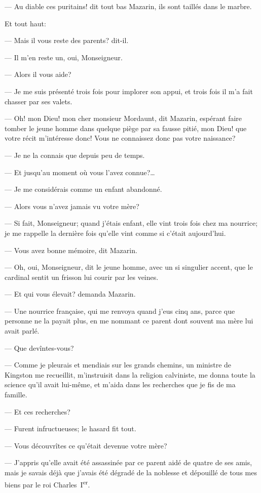 — Au diable ces puritains! dit tout bas Mazarin, ils sont taillés dans le marbre.

Et tout haut:

— Mais il vous reste des parents? dit-il.

— Il m'en reste un, oui, Monseigneur.

— Alors il vous aide?

— Je me suis présenté trois fois pour implorer son appui, et trois fois il m'a fait chasser par ses valets.

— Oh! mon Dieu! mon cher monsieur Mordaunt, dit Mazarin, espérant faire tomber le jeune homme dans quelque piège par sa fausse pitié, mon Dieu! que votre récit m'intéresse donc! Vous ne connaissez donc pas votre naissance?

— Je ne la connais que depuis peu de temps.

— Et jusqu'au moment où vous l'avez connue?\dots

— Je me considérais comme un enfant abandonné.

— Alors vous n'avez jamais vu votre mère?

— Si fait, Monseigneur; quand j'étais enfant, elle vint trois fois chez ma nourrice; je me rappelle la dernière fois qu'elle vint comme si c'était aujourd'hui.

— Vous avez bonne mémoire, dit Mazarin.

— Oh, oui, Monseigneur, dit le jeune homme, avec un si singulier accent, que le cardinal sentit un frisson lui courir par les veines.

— Et qui vous élevait? demanda Mazarin.

— Une nourrice française, qui me renvoya quand j'eus cinq ans, parce que personne ne la payait plus, en me nommant ce parent dont souvent ma mère lui avait parlé.

— Que devîntes-vous?

— Comme je pleurais et mendiais sur les grands chemins, un ministre de Kingston me recueillit, m'instruisit dans la religion calviniste, me donna toute la science qu'il avait lui-même, et m'aida dans les recherches que je fis de ma famille.

— Et ces recherches?

— Furent infructueuses; le hasard fit tout.

— Vous découvrîtes ce qu'était devenue votre mère?

— J'appris qu'elle avait été assassinée par ce parent aidé de quatre de ses amis, mais je savais déjà que j'avais été dégradé de la noblesse et dépouillé de tous mes biens par le roi Charles~I\textsuperscript{er}.

